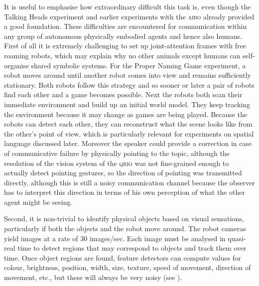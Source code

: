 It is useful to emphasise how extraordinary difficult this task is, even though the Talking Heads experiment and 
earlier experiments with the \textsc{aibo} already 
provided a good foundation. These difficulties are encountered for communication within any group of
autonomous physically embodied agents and hence also humans. 
First of all it is extremely challenging to set up joint-attention frames with free roaming
robots, which may explain why no other animals except humans can self-organise
shared symbolic systems. For the Proper Naming Game experiment, a robot moves around until another robot comes into 
view and remains sufficiently 
stationary. Both robots follow this strategy and so sooner or later a pair of robots find each other
and a game becomes possible. Next the robots both scan their immediate environment and build up an initial world model. 
They keep tracking the environment because it may change as games are being played. 
Because the robots can detect each other, they can reconstruct what the scene looks like from the other's point of 
view, which is particularly relevant for experiments on spatial language discussed later. 
Moreover the speaker could provide a correction in case of 
communicative failure by physically pointing to the topic, although the resolution of the vision system of the \textsc{qrio} was not 
fine-grained enough to actually detect pointing gestures, so the direction of pointing was transmitted directly, although
this is still a noisy communication channel because the observer has to interpret this direction in terms of his own 
perception of what the other agent might be seeing. 

Second, it is non-trivial to identify physical objects based on visual sensations,
particularly if both the objects and the robot move around. The robot
cameras yield images at a rate of 30 images/sec. Each image must be
analysed in quasi-real time to detect regions that may correspond to objects
and track them over time. Once object regions are found, feature detectors can compute values for colour,
brightness, position, width, size, texture, speed of movement,
direction of movement, etc., but these will always be very noisy (see ). 

